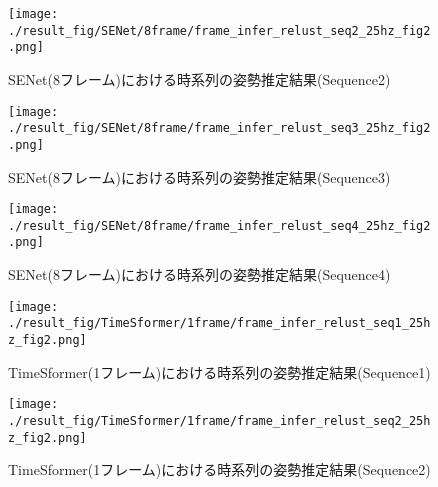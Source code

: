 \begin{figure}[thpb]
  \begin{minipage}[htpb]{1.0\hsize}
  \begin{center}
  \texttt{[image: ./result\_fig/SENet/8frame/frame\_infer\_relust\_seq2\_25hz\_fig2.png]}
  \caption{SENet(8フレーム)における時系列の姿勢推定結果(Sequence2)}
  \end{center}
  \end{minipage}
\end{figure}

\begin{figure}[thpb]
  \begin{minipage}[htpb]{1.0\hsize}
  \begin{center}
  \texttt{[image: ./result\_fig/SENet/8frame/frame\_infer\_relust\_seq3\_25hz\_fig2.png]}
  \caption{SENet(8フレーム)における時系列の姿勢推定結果(Sequence3)}
  \end{center}
  \end{minipage}
\end{figure}

\begin{figure}[thpb]
  \begin{minipage}[htpb]{1.0\hsize}
  \begin{center}
  \texttt{[image: ./result\_fig/SENet/8frame/frame\_infer\_relust\_seq4\_25hz\_fig2.png]}
  \caption{SENet(8フレーム)における時系列の姿勢推定結果(Sequence4)}
  \end{center}
  \end{minipage}
\end{figure}



\begin{figure}[thpb]
  \begin{minipage}[htpb]{1.0\hsize}
  \begin{center}
  \texttt{[image: ./result\_fig/TimeSformer/1frame/frame\_infer\_relust\_seq1\_25hz\_fig2.png]}
  \caption{TimeSformer(1フレーム)における時系列の姿勢推定結果(Sequence1)}
  \end{center}
  \end{minipage}
\end{figure}

\begin{figure}[thpb]
  \begin{minipage}[htpb]{1.0\hsize}
  \begin{center}
  \texttt{[image: ./result\_fig/TimeSformer/1frame/frame\_infer\_relust\_seq2\_25hz\_fig2.png]}
  \caption{TimeSformer(1フレーム)における時系列の姿勢推定結果(Sequence2)}
  \end{center}
  \end{minipage}
\end{figure}

